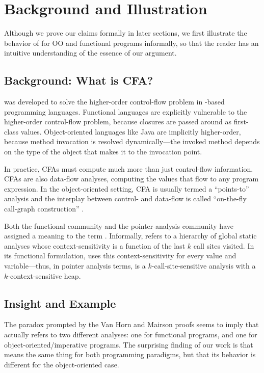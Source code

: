 \section{Background and Illustration}

Although we prove our claims formally in later sections, we first
illustrate the behavior of \kCFA{} for OO and functional
programs informally, so that the reader has an intuitive understanding of the
essence of our argument.

\subsection{Background: What is CFA?}
\kCFA{} was developed to solve the higher-order control-flow problem
in \lc-based programming languages.
Functional languages are explicitly vulnerable to the higher-order
control-flow problem, because closures are passed around as
first-class values.
Object-oriented languages like Java are implicitly higher-order,
because method invocation is resolved dynamically---the invoked method
depends on the type of the object that makes it to the invocation
point.


In practice, CFAs must compute much more than just control-flow
information.  CFAs are also data-flow analyses, computing the values
that flow to any program expression. In the object-oriented setting,
CFA is usually termed a ``points-to'' analysis and the interplay
between control- and data-flow is called ``on-the-fly call-graph
construction'' \cite{Lhotak:2006:PAU}.

Both the functional community and the pointer-analysis community have
assigned a meaning to the term \kCFA.
Informally, \kCFA{} refers to a hierarchy of global static analyses
whose context-sensitivity is a function of the last $k$ call sites 
visited.
In its functional formulation, \kCFA{} uses this context-sensitivity
for every value and variable---thus, in pointer analysis terms,
\kCFA{} is a $k$-call-site-sensitive analysis with a $k$-context-sensitive
heap.


\subsection{Insight and Example}

The paradox prompted by the Van Horn and Mairson proofs seems to imply
that \kCFA{} actually refers to two different analyses: one for
functional programs, and one for object-oriented/imperative programs.
The surprising finding of our work is that \kCFA{} means the same
thing for both programming paradigms, but that its behavior is different
for the object-oriented case.

